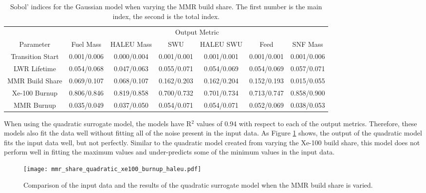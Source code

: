 \begin{table}
    \centering
    \caption{Sobol' indices for the Gaussian model when varying the MMR 
    build share. The first number is the main index, the second is the total 
    index.}
    \label{tab:s7_sobol_mmr_gaussian}
    \begin{tabular}{c c c c c c c}
        \hline
        & \multicolumn{6}{c}{Output Metric} \\
        Parameter & Fuel Mass & HALEU Mass & SWU & HALEU SWU & Feed & SNF Mass \\
        \hline
        Transition Start & 0.001/0.006 & 0.000/0.004 & 0.001/0.001 &
                           0.001/0.001 & 0.001/0.001 & 0.001/0.006\\
        LWR Lifetime & 0.054/0.068 & 0.047/0.063 & 0.055/0.071 &
                       0.054/0.069 & 0.054/0.069 & 0.057/0.071\\
        MMR Build Share & 0.069/0.107 & 0.068/0.107 & 0.162/0.203 &
                          0.162/0.204 & 0.152/0.193 & 0.015/0.055\\
        Xe-100 Burnup & \cellcolor{green!25}0.806/0.846 & \cellcolor{green!25}0.819/0.858 & \cellcolor{green!25}0.700/0.732 &
        \cellcolor{green!25}0.701/0.734 & \cellcolor{green!25}0.713/0.747 & \cellcolor{green!25}0.858/0.900\\
        MMR Burnup & 0.035/0.049 & 0.037/0.050 & 0.054/0.071 &
                     0.054/0.071 & 0.052/0.069 & 0.038/0.053\\
        \hline        
    \end{tabular}
\end{table}

When using the quadratic surrogate model, the models have R$^2$ values of 0.94
with respect to each of the output metrics. Therefore, these models also fit 
the data well without fitting all of the noise present in the input data. 
As Figure \ref{fig:s7_mmr_quadratic} shows, the output of the quadratic model 
fits the input data well, but not perfectly. Similar to the quadratic 
model created from varying the Xe-100 build share, this model 
does not perform well in fitting the maximum values and under-predicts 
some of the minimum values in the input data. 

\begin{figure}
    \centering 
    \texttt{[image: mmr\_share\_quadratic\_xe100\_burnup\_haleu.pdf]}
    \caption{Comparison of the input data and the results of the quadratic 
    surrogate model when the MMR build share is varied.}
    \label{fig:s7_mmr_quadratic}
\end{figure}

